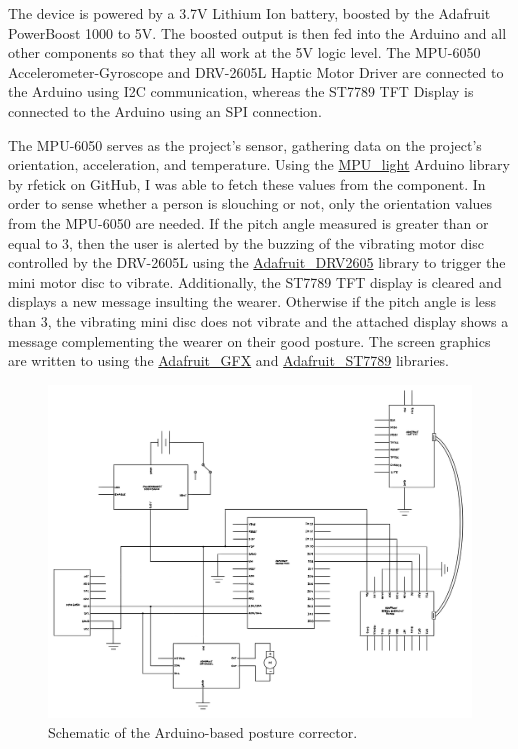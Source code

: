 The device is powered by a 3.7V Lithium Ion battery, boosted by the Adafruit PowerBoost 1000 to 5V. The boosted output is then fed into the Arduino and all other components so that they all work at the 5V logic level. The MPU-6050 Accelerometer-Gyroscope and DRV-2605L Haptic Motor Driver are connected to the Arduino using I2C communication, whereas the ST7789 TFT Display is connected to the Arduino using an SPI connection. 

The MPU-6050 serves as the project's sensor, gathering data on the project's orientation, acceleration, and temperature. Using the \href{https://github.com/rfetick/MPU6050\_light/}{MPU\_light} Arduino library by rfetick on GitHub, I was able to fetch these values from the component. In order to sense whether a person is slouching or not, only the orientation values from the MPU-6050 are needed. 
If the pitch angle measured is greater than or equal to 3, then the user is alerted by the buzzing of the vibrating motor disc controlled by the DRV-2605L using the \href{https://github.com/adafruit/Adafruit\_DRV2605\_Library}{Adafruit\_DRV2605} library to trigger the mini motor disc to vibrate. Additionally, the ST7789 TFT display is cleared and displays a new message insulting the wearer. 
Otherwise if the pitch angle is less than 3, the vibrating mini disc does not vibrate and the attached display shows a message complementing the wearer on their good posture. The screen graphics are written to using the \href{ttps://github.com/adafruit/Adafruit-GFX-Library}{Adafruit\_GFX} and \href{https://github.com/adafruit/Adafruit-ST7735-Library }{Adafruit\_ST7789} libraries. 

\begin{figure}[h]
	\centering
	\includegraphics[width=15cm]{schematic.png}
	\caption{Schematic of the Arduino-based posture corrector.}
\end{figure}

